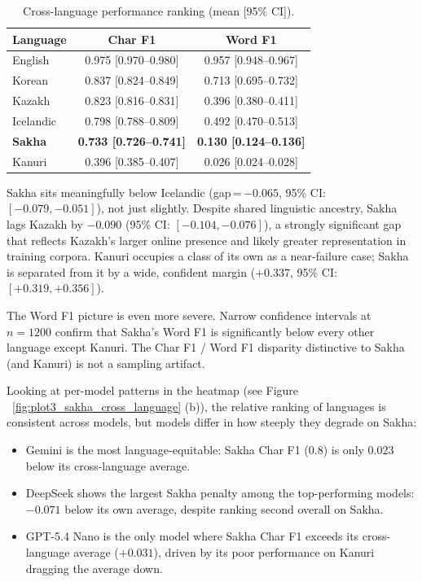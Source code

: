 \documentclass[11pt]{article}
\begin{document}
\begin{table}[ht]
    \centering
    \caption{Cross-language performance ranking (mean [95\% CI]).}
    \label{tab:lang_ranking}
    \small
    \begin{tabular}{lcc}
        \toprule
        \textbf{Language} & \textbf{Char F1} & \textbf{Word F1} \\
        \midrule
        English            & 0.975 [0.970--0.980] & 0.957 [0.948--0.967] \\
        Korean             & 0.837 [0.824--0.849] & 0.713 [0.695--0.732] \\
        Kazakh             & 0.823 [0.816--0.831] & 0.396 [0.380--0.411] \\
        Icelandic          & 0.798 [0.788--0.809] & 0.492 [0.470--0.513] \\
        \textbf{Sakha}     & \textbf{0.733 [0.726--0.741]} & \textbf{0.130 [0.124--0.136]} \\
        Kanuri             & 0.396 [0.385--0.407] & 0.026 [0.024--0.028] \\
        \bottomrule
    \end{tabular}
\end{table}

Sakha sits meaningfully below Icelandic (gap\,=\,$-0.065$, 95\% CI: $[-0.079, -0.051]$), not just slightly.
Despite shared linguistic ancestry, Sakha lags Kazakh by $-0.090$ (95\% CI: $[-0.104, -0.076]$), a strongly significant gap that reflects Kazakh's larger online presence and likely greater representation in training corpora.
Kanuri occupies a class of its own as a near-failure case; Sakha is separated from it by a wide, confident margin ($+0.337$, 95\% CI: $[+0.319, +0.356]$).

The Word F1 picture is even more severe.
Narrow confidence intervals at $n=1200$ confirm that Sakha's Word F1 is significantly below every other language except Kanuri.
The Char F1 / Word F1 disparity distinctive to Sakha (and Kanuri) is not a sampling artifact.

Looking at per-model patterns in the heatmap (see Figure ~\ref{fig:plot3_sakha_cross_language} (b)), the relative ranking of languages is consistent across models, but models differ in how steeply they degrade on Sakha:

\begin{itemize}
\item Gemini is the most language-equitable: Sakha Char F1 (0.8) is only 0.023 below its cross-language average.
\item DeepSeek shows the largest Sakha penalty among the top-performing models: $-0.071$ below its own average, despite ranking second overall on Sakha.
\item GPT-5.4 Nano is the only model where Sakha Char F1 exceeds its cross-language average ($+0.031$), driven by its poor performance on Kanuri dragging the average down.
\end{itemize}
\end{document}
